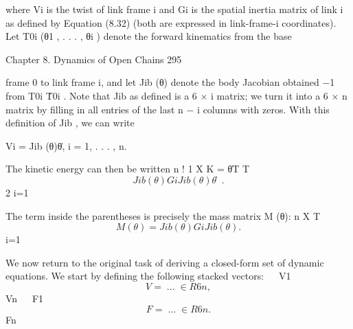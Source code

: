 \documentclass[12pt,a4paper]{article}
\begin{document}
where Vi is the twist of link frame {i} and Gi is the spatial inertia matrix
of link i as defined by Equation (8.32) (both are expressed in link-frame-{i}
coordinates). Let T0i (θ1 , . . . , θi ) denote the forward kinematics from the base


Chapter 8. Dynamics of Open Chains                                                                  295

frame {0} to link frame {i}, and let Jib (θ) denote the body Jacobian obtained
        −1
from T0i   Ṫ0i . Note that Jib as defined is a 6 × i matrix; we turn it into a 6 × n
matrix by filling in all entries of the last n − i columns with zeros. With this
definition of Jib , we can write

                                Vi = Jib (θ)θ̇,          i = 1, . . . , n.

The kinetic energy can then be written
                                             n
                                                                      !
                                 1           X
                              K = θ̇T                T
\begin{equation}
Jib (θ)Gi Jib (θ)     θ̇.
\label{eq:8.56}
\end{equation}
                                 2            i=1

The term inside the parentheses is precisely the mass matrix M (θ):
                                              n
                                              X
                                                     T
\begin{equation}
M (θ) =           Jib (θ)Gi Jib (θ).
\label{eq:8.57}
\end{equation}
                                              i=1

   We now return to the original task of deriving a closed-form set of dynamic
equations. We start by defining the following stacked vectors:
                                         
                                       V1
                                         
\begin{equation}
V =  ...  ∈ R6n ,
\label{eq:8.58}
\end{equation}
                                                    Vn
                                                 
                                              F1
                                                 
\begin{equation}
F     =  ...  ∈ R6n .
\label{eq:8.59}
\end{equation}
                                                    Fn
\end{document}
